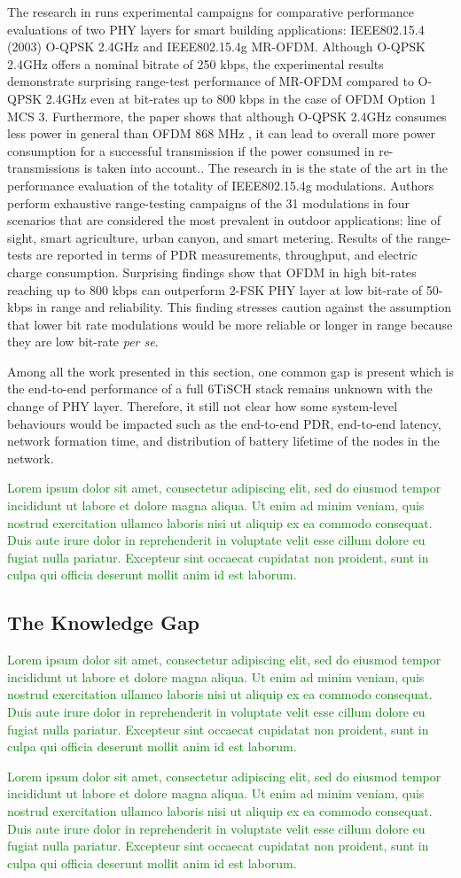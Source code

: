 \documentclass[journal]{IEEEtran}
\newcommand{\oqpsk}        {O-QPSK 2.4GHz }
\newcommand{\ofdm}         {OFDM 868 MHz }
\newcommand{\lorem}        {\textcolor{green}{Lorem ipsum dolor sit amet, consectetur adipiscing elit, sed do eiusmod tempor incididunt ut labore et dolore magna aliqua. Ut enim ad minim veniam, quis nostrud exercitation ullamco laboris nisi ut aliquip ex ea commodo consequat. Duis aute irure dolor in reprehenderit in voluptate velit esse cillum dolore eu fugiat nulla pariatur. Excepteur sint occaecat cupidatat non proident, sunt in culpa qui officia deserunt mollit anim id est laborum.}}
\begin{document}
The research in \cite{munoz18overview} runs experimental campaigns for comparative performance evaluations of two PHY layers for smart building applications: IEEE802.15.4 (2003) \oqpsk and IEEE802.15.4g MR-OFDM. 
Although \oqpsk offers a nominal bitrate of 250 kbps, the experimental results demonstrate surprising range-test performance of MR-OFDM compared to \oqpsk even at bit-rates up to 800 kbps in the case of OFDM Option 1 MCS 3. 
Furthermore, the paper shows that although \oqpsk consumes less power in general than \ofdm, it can lead to overall more power consumption for a successful transmission if the power consumed in re-transmissions is taken into account..  
The research in \cite{munoz18evaluationa} is the state of the art in the performance evaluation of the totality of IEEE802.15.4g modulations.
Authors perform exhaustive  range-testing campaigns of the 31 modulations in four scenarios that are considered the most prevalent in outdoor applications: line of sight, smart agriculture, urban canyon, and smart metering. 
Results of the range-tests are reported in terms of PDR measurements, throughput, and electric charge consumption.
Surprising findings show that OFDM in high bit-rates reaching up to 800 kbps can outperform 2-FSK PHY layer at low bit-rate of 50-kbps in range and reliability. 
This finding stresses caution against the assumption that lower bit rate modulations would be more reliable or longer in range because they are low bit-rate \textit{per se}. 

Among all the work presented in this section, one common gap is present which is the end-to-end performance of a full 6TiSCH stack remains unknown with the change of PHY layer. 
Therefore, it still not clear how some system-level behaviours would be impacted such as the end-to-end  PDR, end-to-end latency, network formation time, and distribution of battery lifetime of the nodes in the network.  

%

\lorem
\cite{brachmann19ieee}


\subsection{The Knowledge Gap}
\lorem

\lorem
\end{document}
